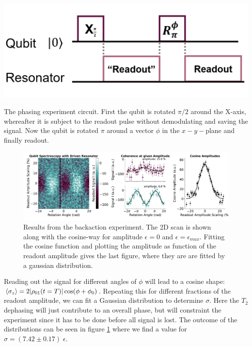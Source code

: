 \begin{marginfigure}
    \centering
    \includegraphics[]{Figs/circuits/dephasing.png}
    \caption{The phasing experiment circuit. First the qubit is rotated $\pi/2$ around the X-axis, whereafter it is subject to the readout pulse without demodulating and saving the signal. Now the qubit is rotated $\pi$ around a vector $\phi$ in the $x-y-$plane and finally readout.}
    \label{fig:efficiency_dephasing_experiment}
\end{marginfigure}
\begin{figure}
    \centering
    \includegraphics{Calibrations/Figures/dephasing_by_measurement.pdf}
    \caption{Results from the backaction experiment. The 2D scan is shown along with the cosine-way for amplitude $\epsilon = 0$ and $\epsilon = \epsilon_{max}$. Fitting the cosine function and plotting the amplitude as function of the readout amplitude gives the last figure, where they are are fitted by a gaussian distribution.}
    \label{fig:efficiency_dephasing_result}
\end{figure}

Reading out the signal for different angles of $\phi$ will lead to a cosine shape: $\expval{\sigma_z} = 2 |\rho_{01}(t= T)| \cos(\phi+\phi_0)$. Repeating this for different fractions of the readout amplitude, we can fit a Gaussian distribution to determine $\sigma$. Here the $T_2$ dephasing will just contribute to an overall phase, but will constraint the experiment since it has to be done before all signal is lost. The outcome of the distributions can be seen in figure \ref{fig:efficiency_dephasing_result} where we find a value for $\sigma = (7.42 \pm 0.17) \; \epsilon$.

